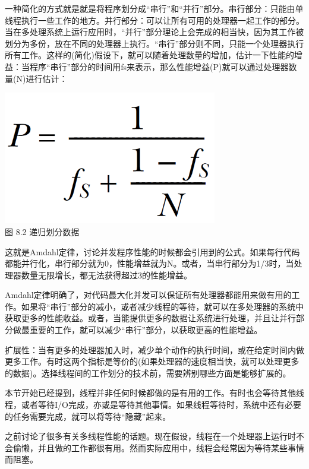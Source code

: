 一种简化的方式就是就是将程序划分成“串行”和“并行”部分。串行部分：只能由单线程执行一些工作的地方。并行部分：可以让所有可用的处理器一起工作的部分。当在多处理系统上运行应用时，“并行”部分理论上会完成的相当快，因为其工作被划分为多份，放在不同的处理器上执行。“串行”部分则不同，只能一个处理器执行所有工作。这样的(简化)假设下，就可以随着处理数量的增加，估计一下性能的增益：当程序“串行”部分的时间用fs来表示，那么性能增益(P)就可以通过处理器数量(N)进行估计：

\begin{center}
  \includegraphics[width=0.7\textwidth]{content/chapter08/images/amdahl_law.png}\\
  图 8.2 递归划分数据
\end{center}

这就是Amdahl定律，讨论并发程序性能的时候都会引用到的公式。如果每行代码都能并行化，串行部分就为0，性能增益就为N。或者，当串行部分为1/3时，当处理器数量无限增长，都无法获得超过3的性能增益。

Amdahl定律明确了，对代码最大化并发可以保证所有处理器都能用来做有用的工作。如果将“串行”部分的减小，或者减少线程的等待，就可以在多处理器的系统中获取更多的性能收益。或者，当能提供更多的数据让系统进行处理，并且让并行部分做最重要的工作，就可以减少“串行”部分，以获取更高的性能增益。

扩展性：当有更多的处理器加入时，减少单个动作的执行时间，或在给定时间内做更多工作。有时这两个指标是等价的(如果处理器的速度相当快，就可以处理更多的数据)。选择线程间的工作划分的技术前，需要辨别哪些方面是能够扩展的。

本节开始已经提到，线程并非任何时候都做的是有用的工作。有时也会等待其他线程，或者等待I/O完成，亦或是等待其他事情。如果线程等待时，系统中还有必要的任务需要完成，就可以将等待“隐藏”起来。


之前讨论了很多有关多线程性能的话题。现在假设，线程在一个处理器上运行时不会偷懒，并且做的工作都很有用。然而实际应用中，线程会经常因为等待某些事情而阻塞。

